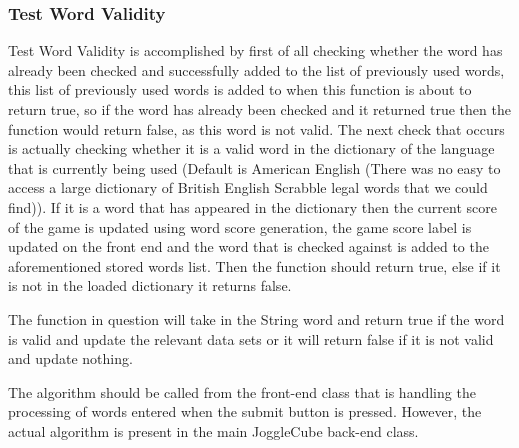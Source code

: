     \subsubsection{Test Word Validity}
    Test Word Validity is accomplished by first of all checking whether the word has already been checked and successfully added to the list of previously used words, this list of previously used words is added to when this function is about to return true, so if the word has already been checked and it returned true then the function would return false, as this word is not valid. The next check that occurs is actually checking whether it is a valid word in the dictionary of the language that is currently being used (Default is American English (There was no easy to access a large dictionary of British English Scrabble legal words that we could find)). If it is a word that has appeared in the dictionary then the current score of the game is updated using word score generation, the game score label is updated on the front end and the word that is checked against is added to the aforementioned stored words list. Then the function should return true, else if it is not in the loaded dictionary it returns false.
    
    The function in question will take in the String word and return true if the word is valid and update the relevant data sets or it will return false if it is not valid and update nothing.
    
    The algorithm should be called from the front-end class that is handling the processing of words entered when the submit button is pressed. However, the actual algorithm is present in the main JoggleCube back-end class.